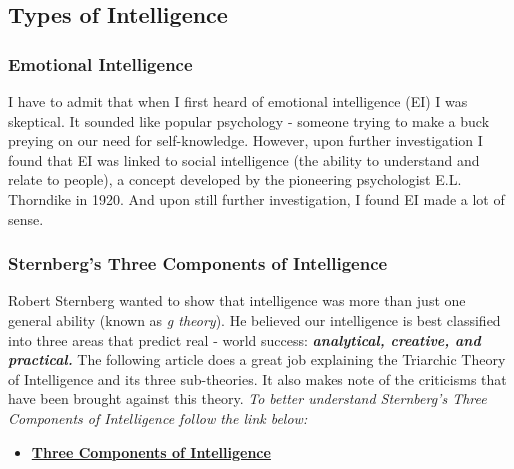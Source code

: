 \documentclass[
]{book}
\providecommand{\tightlist}{%
  \setlength{\itemsep}{0pt}\setlength{\parskip}{0pt}}
\begin{document}
\hypertarget{types-of-intelligence}{%
\subsection*{Types of Intelligence}\label{types-of-intelligence}}

\hypertarget{emotional-intelligence}{%
\subsubsection*{Emotional Intelligence}\label{emotional-intelligence}}

I have to admit that when I first heard of emotional intelligence (EI) I was skeptical. It sounded like popular psychology - someone trying to make a buck preying on our need for self-knowledge. However, upon further investigation I found that EI was linked to social intelligence (the ability to understand and relate to people), a concept developed by the pioneering psychologist E.L. Thorndike in 1920. And upon still further investigation, I found EI made a lot of sense.

\hypertarget{sternbergs-three-components-of-intelligence}{%
\subsubsection*{Sternberg's Three Components of Intelligence}\label{sternbergs-three-components-of-intelligence}}

Robert Sternberg wanted to show that intelligence was more than just one general ability (known as \emph{g theory}). He believed our intelligence is best classified into three areas that predict real - world success: \textbf{\emph{analytical, creative, and practical.}} The following article does a great job explaining the Triarchic Theory of Intelligence and its three sub-theories. It also makes note of the criticisms that have been brought against this theory. \emph{To better understand Sternberg's Three Components of Intelligence follow the link below:}

\begin{itemize}
\tightlist
\item
  \href{https://www.thoughtco.com/triarchic-theory-of-intelligence-4172497}{\textbf{Three Components of Intelligence}}
\end{itemize}
\end{document}
